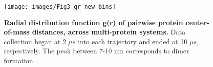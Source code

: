 \begin{figure}[htp]
\centering
\texttt{[image: images/Fig3\_gr\_new\_bins]}
\caption[Pairwise distance distribution across multi-protein systems.] {{\bf Radial distribution function g(r)  of pairwise protein center-of-mass distances, across multi-protein systems.}  Data collection began at 2 $\mu s$ into each trajectory and ended at 10 $\mu s$, respectively. The peak between 7-10 nm corresponds to dimer formation.  }
\label{fig:Figure6}
\end{figure}





